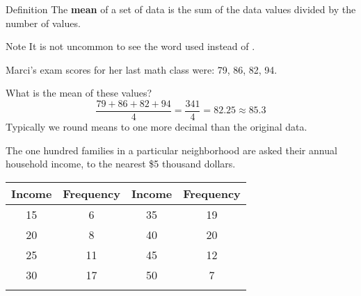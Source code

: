 \documentclass{beamer}
\begin{document}
\begin{frame}
\begin{example}
{
}
\vspace{-5mm}
\end{example}
\end{frame}

\begin{frame}
\begin{block}{Definition}
The \textbf{mean} of a set of data is the sum of the data values divided by the number of values.
\end{block}\pause

\begin{block}{Note}
It is not uncommon to see the word  used instead of .
\end{block}\pause

\begin{example}
Marci's exam scores for her last math class were: 79, 86, 82, 94. 

What is the mean of these values?\pause
\begin{equation*}
\dfrac{79+86+82+94}{4}=\dfrac{341}{4}=82.25\approx 85.3
\end{equation*}
Typically we round means to one more decimal than the original data.
\end{example}
\end{frame}

\begin{frame}
\begin{example}
The one hundred families in a particular neighborhood are asked their annual household income, to the nearest \$5 thousand dollars. 
\begin{center}
\begin{tabular}{|c|c||c|c|}
\hline
\textbf{Income} & \textbf{Frequency} & \textbf{Income} & \textbf{Frequency} \\\hline
15 &6 & 35 &19\\\hline
20 &8 & 40 &20\\\hline
25 &11 & 45 &12\\\hline
30 &17 & 50 &7\\\hline
\end{t
\end{tabular}
\end{center}
\end{example}
\end{frame}
\end{document}
